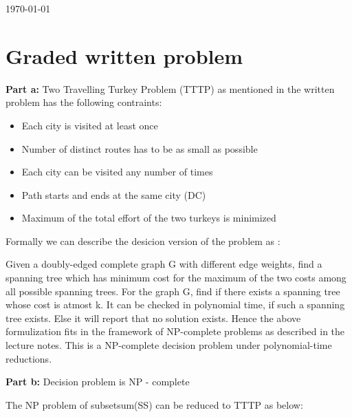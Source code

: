 \documentclass[8pt]{article}
\begin{document}
\hfill \small{\today} \\
\setlength{\fboxrule}{.5mm}\setlength{\fboxsep}{1.2mm}
\newlength{\boxlength}\setlength{\boxlength}{\textwidth}
\addtolength{\boxlength}{-4mm}
\begin{center}\end{center}
\vspace{5mm}

\section{Graded written problem}

\textbf{Part a:} Two Travelling Turkey Problem (TTTP) as mentioned in the written problem has the following contraints:
\begin{itemize}
\item Each city is visited at least once
\item Number of distinct routes has to be as small as possible
\item Each city can be visited any number of times
\item Path starts and ends at the same city (DC)
\item Maximum of the total effort of the two turkeys is minimized
\end{itemize}

Formally we can describe the desicion version of the problem as :

Given a doubly-edged complete graph G with different edge weights, find a spanning tree which has minimum cost for the maximum of the two costs among all possible spanning trees. For the graph G, find if there exists a spanning tree whose cost is atmost k.
It can be checked in polynomial time, if such a spanning tree exists. Else it will report that no solution exists. Hence the above formulization fits in the framework of NP-complete problems as described in the lecture notes. This is a NP-complete decision problem under polynomial-time reductions. 

\textbf{Part b:} Decision problem is NP - complete

The NP problem of subsetsum(SS) can be reduced to TTTP as below:
\end{document}

